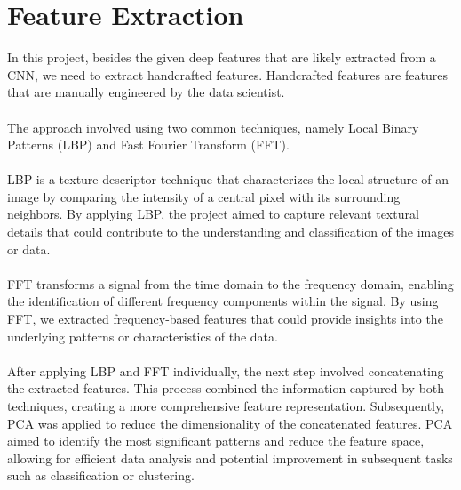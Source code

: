 \documentclass{template}
\begin{document}
\section{Feature Extraction}
In this project, besides the given deep features that are likely extracted from a CNN, we need to extract handcrafted features. Handcrafted features are features that are manually engineered by the data scientist.\\\\
The approach involved using two common techniques, namely Local Binary Patterns (LBP) and Fast Fourier Transform (FFT).\\\\
LBP is a texture descriptor technique that characterizes the local structure of an image by comparing the intensity of a central pixel with its surrounding neighbors. By applying LBP, the project aimed to capture relevant textural details that could contribute to the understanding and classification of the images or data.\\\\
FFT transforms a signal from the time domain to the frequency domain, enabling the identification of different frequency components within the signal. By using FFT, we extracted frequency-based features that could provide insights into the underlying patterns or characteristics of the data.\\\\
After applying LBP and FFT individually, the next step involved concatenating the extracted features. This process combined the information captured by both techniques, creating a more comprehensive feature representation. Subsequently, PCA was applied to reduce the dimensionality of the concatenated features. PCA aimed to identify the most significant patterns and reduce the feature space, allowing for efficient data analysis and potential improvement in subsequent tasks such as classification or clustering.
\end{document}
